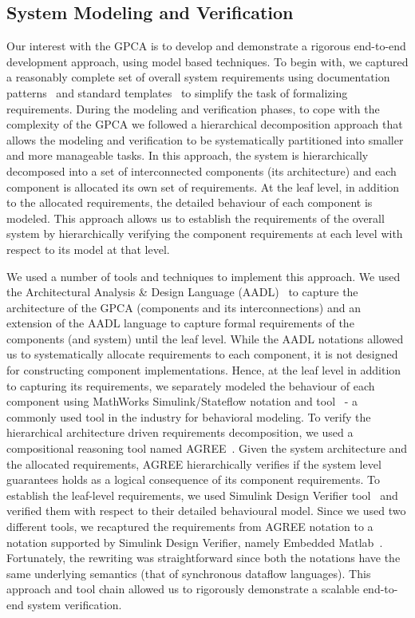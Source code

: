 \subsection {System Modeling and Verification}
\vspace{-0.07in}
Our interest with the GPCA is to develop and demonstrate a rigorous end-to-end development approach, using model based techniques. To begin with, we captured a reasonably complete set of overall system requirements using documentation patterns~\cite{mavin2009easy} and standard templates~\cite{IEEEFormats} to simplify the task of formalizing requirements. During the modeling and verification phases, to cope with the complexity of the GPCA we followed a hierarchical decomposition approach that allows the modeling and verification to be systematically partitioned into smaller and more manageable tasks. In this approach, the system is hierarchically decomposed into a set of interconnected components (its architecture) and each component is allocated its own set of requirements. At the leaf level, in addition to the allocated requirements, the detailed behaviour of each component is modeled. This approach allows us to establish the requirements of the overall system by hierarchically verifying the component requirements at each level with respect to its model at that level.

We used a number of tools and techniques to implement this approach. We used the Architectural Analysis \& Design Language (AADL)~\cite{AADL:Overview} to capture the architecture of the GPCA (components and its interconnections) and an extension of the AADL language to capture formal requirements of the components (and system) until the leaf level. While the AADL notations allowed us to systematically allocate requirements to each component, it is not designed for constructing component implementations. Hence, at the leaf level in addition to capturing its requirements, we separately modeled the behaviour of each component using MathWorks Simulink/Stateflow notation and tool~\cite{MathWorks} - a commonly used tool in the industry for behavioral modeling. To verify the hierarchical architecture driven requirements decomposition, we used a compositional reasoning tool named AGREE~\cite{NFM2012:CoGaMiWhLaLu}. Given the system architecture and the allocated requirements, AGREE hierarchically verifies if the system level guarantees holds as a logical consequence of its component requirements. To establish the leaf-level requirements, we used Simulink Design Verifier tool~\cite{MathWorks} and verified them with respect to their detailed behavioural model. Since we used two different tools, we recaptured the requirements from AGREE notation to a notation supported by Simulink Design Verifier, namely Embedded Matlab~\cite{MathWorks}. Fortunately, the rewriting was straightforward since both the notations have the same underlying semantics (that of synchronous dataflow languages). This approach and tool chain allowed us to rigorously demonstrate a scalable end-to-end system verification.


